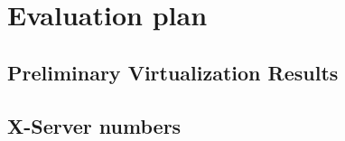 \section{Evaluation plan}
\subsection{Preliminary Virtualization Results}
\subsection{X-Server numbers}
